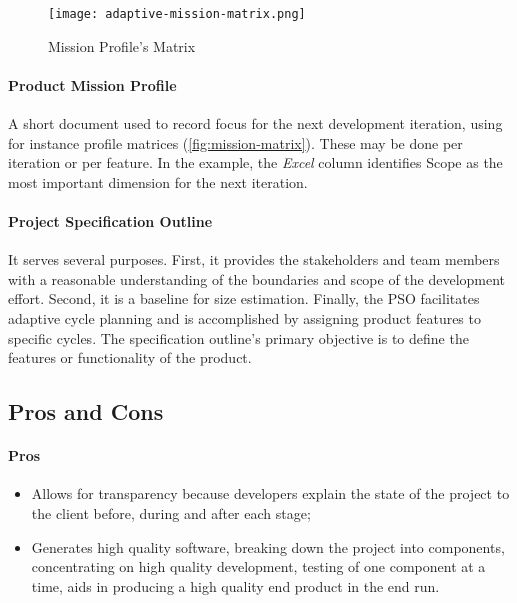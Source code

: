 \documentclass[main.tex]{subfiles}
\begin{document}
\begin{wrapfigure}[8]{r}[2em]{0.4\textwidth}
	\vspace*{-\baselineskip}
	\texttt{[image: adaptive-mission-matrix.png]}
	\caption{Mission Profile's Matrix\label{fig:mission-matrix}}
\end{wrapfigure}

\paragraph{Product Mission Profile}
A short document used to record focus for the next development iteration, using for instance profile matrices (\autoref{fig:mission-matrix}). These may be done per iteration or per feature.
In the example, the \textsl{Excel} column identifies Scope as the most important dimension for the next iteration.

\paragraph{Project Specification Outline}
It serves several purposes.
First, it provides the stakeholders and team members with a reasonable understanding of the boundaries and scope of the development effort.
Second, it is a baseline for size estimation.
Finally, the PSO facilitates adaptive cycle planning and is accomplished by assigning product features to specific cycles.
The specification outline's primary objective is to define the features or functionality of the product.

\subsection{Pros and Cons}

\paragraph{Pros}
\begin{itemize}
	\item Allows for transparency because developers explain the state of the project to the client before, during and after each stage;
	\item Generates high quality software, breaking down the project into components, concentrating on high quality development, testing of one component at a time, aids in producing a high quality end product in the end run.
\end{itemize}
\end{document}
